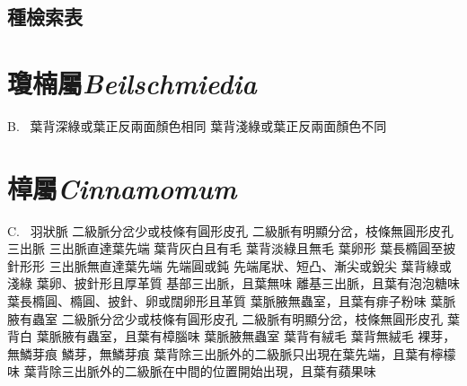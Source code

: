 \documentclass[12pt,a4paper]{article}
\begin{document}
\subsection*{種檢索表}
\section{瓊楠屬\textit{Beilschmiedia}}
\begin{Key*}{B.~}
\indent\alter 葉背深綠或葉正反兩面顏色相同
\alter 葉背淺綠或葉正反兩面顏色不同
\end{Key*}

\section{樟屬\textit{Cinnamomum}}

\begin{Key*}{C.~}  
\indent\alter 羽狀脈 
    \alter 二級脈分岔少或枝條有圓形皮孔
    \alter 二級脈有明顯分岔，枝條無圓形皮孔
\alter 三出脈
    \alter 三出脈直達葉先端
        \alter 葉背灰白且有毛
        \alter 葉背淡綠且無毛
            \alter 葉卵形
            \alter 葉長橢圓至披針形形
    \alter 三出脈無直達葉先端
        \alter 先端圓或鈍
	    \alter 先端尾狀、短凸、漸尖或銳尖
		    \alter 葉背綠或淺綠
		        \alter 葉卵、披針形且厚革質
		            \alter 基部三出脈，且葉無味
		            \alter 離基三出脈，且葉有泡泡糖味
		        \alter 葉長橢圓、橢圓、披針、卵或闊卵形且革質
		            \alter 葉脈腋無蟲室，且葉有痱子粉味
		            \alter 葉脈腋有蟲室
		                \alter 二級脈分岔少或枝條有圓形皮孔
                        \alter 二級脈有明顯分岔，枝條無圓形皮孔
		    \alter 葉背白
		        \alter 葉脈腋有蟲室，且葉有樟腦味
		        \alter 葉脈腋無蟲室
		            \alter 葉背有絨毛
		            \alter 葉背無絨毛
		                \alter 裸芽，無鱗芽痕
		                \alter 鱗芽，無鱗芽痕
		                    \alter 葉背除三出脈外的二級脈只出現在葉先端，且葉有檸檬味
		                    \alter 葉背除三出脈外的二級脈在中間的位置開始出現，且葉有蘋果味
\end{Key*}
\newpage
\end{document}

